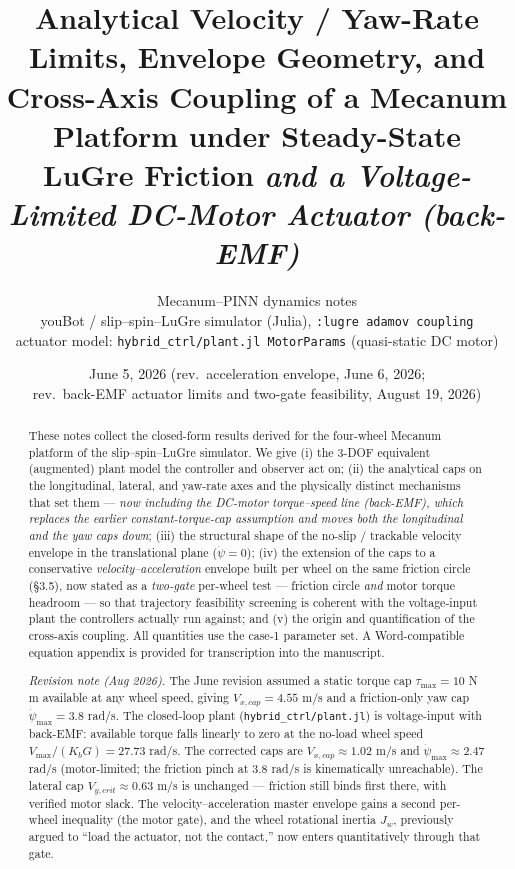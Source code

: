 \documentclass[11pt]{article}
\title{Analytical Velocity / Yaw-Rate Limits, Envelope Geometry, and
Cross-Axis Coupling of a Mecanum Platform under Steady-State LuGre Friction
\emph{and a Voltage-Limited DC-Motor Actuator (back-EMF)}}
\author{Mecanum--PINN dynamics notes\\
\small youBot / slip--spin--LuGre simulator (Julia), \texttt{:lugre adamov coupling}\\
\small actuator model: \texttt{hybrid\_ctrl/plant.jl MotorParams} (quasi-static DC motor)}
\date{June 5, 2026 \quad(rev.\ acceleration envelope, June 6, 2026;\\
rev.\ back-EMF actuator limits and two-gate feasibility, August 19, 2026)}
\begin{document}
\maketitle

\begin{abstract}
These notes collect the closed-form results derived for the four-wheel Mecanum platform of
the slip--spin--LuGre simulator. We give (i) the 3-DOF equivalent (augmented) plant model
the controller and observer act on; (ii) the analytical caps on the longitudinal, lateral, and
yaw-rate axes and the physically distinct mechanisms that set them --- \emph{now including the
DC-motor torque--speed line (back-EMF), which replaces the earlier constant-torque-cap
assumption and moves both the longitudinal and the yaw caps down}; (iii) the structural shape
of the no-slip / trackable velocity envelope in the translational plane ($\dot\psi=0$); (iv) the
extension of the caps to a conservative \emph{velocity--acceleration} envelope built per wheel
on the same friction circle (\S3.5), now stated as a \emph{two-gate} per-wheel test --- friction
circle \emph{and} motor torque headroom --- so that trajectory feasibility screening is coherent
with the voltage-input plant the controllers actually run against; and (v) the origin and
quantification of the cross-axis coupling. All quantities use the case-1 parameter set. A
Word-compatible equation appendix is provided for transcription into the manuscript.

\smallskip
\noindent\emph{Revision note (Aug 2026).} The June revision assumed a static torque cap
$\tau_{\max}=10$ N\,m available at any wheel speed, giving $V_{x,cap}=4.55$ m/s and a
friction-only yaw cap $\dot\psi_{\max}=3.8$ rad/s. The closed-loop plant
(\texttt{hybrid\_ctrl/plant.jl}) is voltage-input with back-EMF: available torque falls
linearly to zero at the no-load wheel speed $V_{\max}/(K_bG)=27.73$ rad/s. The corrected caps
are $V_{x,cap}\approx1.02$ m/s and $\dot\psi_{\max}\approx2.47$ rad/s (motor-limited; the
friction pinch at 3.8 rad/s is kinematically unreachable). The lateral cap
$V_{y,crit}\approx0.63$ m/s is unchanged --- friction still binds first there, with verified
motor slack. The velocity--acceleration master envelope gains a second per-wheel inequality
(the motor gate), and the wheel rotational inertia $J_w$, previously argued to ``load the
actuator, not the contact,'' now enters quantitatively through that gate.
\end{abstract}
\end{document}
